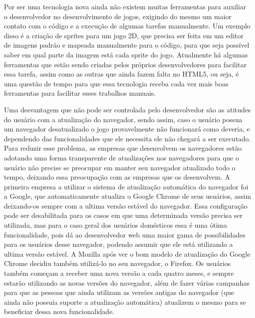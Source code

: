 Por ser uma tecnologia nova ainda não existem muitas ferramentas para
auxiliar o desenvolvedor no desenvolvimento de jogos, exigindo do
mesmo um maior contato com o código e a execução de algumas tarefas
manualmente. Um exemplo disso é a criação de sprites para um jogo 2D,
que precisa ser feita em um editor de imagens padrão e mapeada
manualmente para o código, para que seja possível saber em qual parte
da imagem está cada sprite do jogo.
Atualmente há algumas ferramentas que estão sendo criadas pelos
próprios desenvolvedores para facilitar essa tarefa, assim como as
outras que ainda fazem falta no HTML5, ou seja, é uma questão de tempo
para que essa tecnologia receba cada vez mais boas ferramentas para
facilitar esses trabalhos manuais.

Uma desvantagem que não pode ser controlada pelo desenvolvedor são as
atitudes do usuário com a atualização do navegador, sendo assim, caso
o usuário possua um navegador desatualizado o jogo provavelmente não
funcionará como deveria, e dependendo das funcionalidades que ele
necessita ele não chegará a ser executado. Para reduzir esse problema,
as empresas que desenvolvem os navegadores estão adotando uma forma
transparente de atualizações nos navegadores para que o usuário não
precise se preocupar em manter seu navegador atualizado todo o tempo,
deixando essa preocupação com as empresas que os desenvolvem.
A primeira empresa a utilizar o sistema de atualização automática do
navegador foi a Google, que automaticamente atualiza o Google Chrome
de seus usuários, assim deixando-os sempre com a ultima versão estável
do navegador. Essa configuração pode ser desabilitada para os casos em
que uma determinada versão precisa ser utilizada, mas para o caso
geral dos usuários domésticos essa é uma ótima funcionalidade, pois dá
ao desenvolvedor web uma maior gama de possibilidades para os usuários
desse navegador, podendo assumir que ele está utilizando a ultima
versão estável.
A Mozilla após ver o bom modelo de atualização do Google Chrome
decidiu também utilizá-lo no seu navegador, o Firefox. Os usuários
também começam a receber uma nova versão a cada quatro meses, e sempre
estarão utilizando as novas versões do navegador, além de fazer várias
campanhas para que as pessoas que ainda utilizam as versões antigas do navegador (que ainda
não possuía suporte a atualização automática) atualizem o mesmo para
se beneficiar dessa nova funcionalidade.
